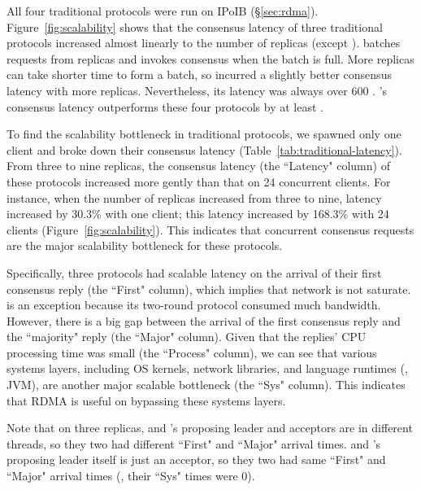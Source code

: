All four traditional protocols were run on IPoIB (\S\ref{sec:rdma}). 
Figure~\ref{fig:scalability} shows that the consensus latency of three 
traditional protocols increased almost linearly to the number of replicas 
(except \spaxos). \spaxos batches requests from replicas and invokes consensus 
when the batch is full. More replicas can take shorter time to form a batch, so 
\spaxos incurred a slightly better consensus latency with more replicas. 
Nevertheless, its latency was always over 600 \us. \xxx's consensus latency 
outperforms these four protocols by at least \comptradlow.



To find the scalability bottleneck in traditional protocols, we spawned 
only one client and broke down their consensus 
latency (Table~\ref{tab:traditional-latency}). From three to nine replicas, the 
consensus latency (the ``Latency" column) of these protocols increased more 
gently than that on 24 concurrent clients. For instance, when the number of 
replicas increased from three to nine, \zookeeper latency increased by 30.3\% 
with one client; this latency increased by 168.3\% with 24 clients 
(Figure~\ref{fig:scalability}). This indicates that concurrent consensus 
requests are the major scalability bottleneck for these protocols.

Specifically, three protocols had scalable latency on the arrival of their 
first consensus reply (the ``First" column), which implies that network is not 
saturate. \libpaxos is an exception because its two-round protocol consumed 
much bandwidth. However, there is a big gap between the arrival of the first 
consensus reply and the ``majority" reply (the ``Major" column). Given that the 
replies' CPU processing time was small (the ``Process" column), we can see that 
various systems layers, including OS kernels, network libraries, and 
language runtimes (\eg, JVM), are another major scalable bottleneck (the ``Sys" 
column). This indicates that RDMA is useful on bypassing these systems layers.

Note that on three replicas, \libpaxos and \crane's proposing 
leader and acceptors are in different threads, so they two had different 
``First" and ``Major" arrival times. \crane and \spaxos's proposing 
leader itself is just an acceptor, so they two had same ``First" and ``Major" 
arrival times (\ie, their ``Sys" times were 0).

